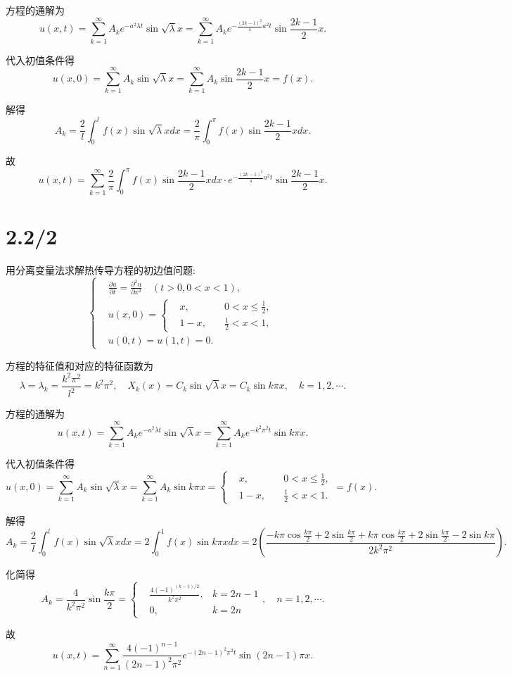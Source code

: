 \documentclass[11pt,a4paper]{article}
\begin{document}
方程的通解为
$$u(x,t)=\sum_{k=1}^\infty A_ke^{-a^2\lambda t}\sin\sqrt{\lambda}x=\sum_{k=1}^\infty A_k e^{-\frac{(2k-1)^2}{4}a^2 t}\sin\frac{2k-1}{2}x.$$

代入初值条件得
$$u(x,0)=\sum_{k=1}^\infty A_k\sin\sqrt{\lambda}x=\sum_{k=1}^\infty A_k\sin\frac{2k-1}{2}x=f(x).$$

解得
$$A_k=\frac{2}{l}\int_0^l f(x)\sin\sqrt{\lambda}xdx=\frac{2}{\pi}\int_0^\pi f(x)\sin\frac{2k-1}{2}xdx.$$

故
$$u(x,t)=\sum_{k=1}^\infty \frac{2}{\pi}\int_0^\pi f(x)\sin\frac{2k-1}{2}xdx \cdot e^{-\frac{(2k-1)^2}{4}a^2 t}\sin\frac{2k-1}{2}x.$$

\section{2.2/2}

\begin{problem}
用分离变量法求解热传导方程的初边值问题:
$$\left\{\begin{aligned}
     & \frac{\partial u}{\partial t}=\frac{\partial^2u}{\partial x^2}\quad (t>0,0<x<1), \\
     & u(x,0)=\left\{\begin{aligned}
       &x,\quad &0<x\leqslant\frac{1}{2},\\
       &1-x,\quad &\frac{1}{2}<x<1,
     \end{aligned}\right.                           \\
     & u(0,t) = u(1,t)=0.
  \end{aligned}\right.$$
\end{problem}

方程的特征值和对应的特征函数为
$$\lambda=\lambda_k=\frac{k^2\pi^2}{l^2}=k^2\pi^2,\quad X_k(x)=C_k\sin\sqrt{\lambda}x=C_k\sin k\pi x,\quad k=1,2,\cdots.$$

方程的通解为
$$u(x,t)=\sum_{k=1}^\infty A_ke^{-a^2\lambda t}\sin\sqrt{\lambda}x=\sum_{k=1}^\infty A_ke^{-k^2\pi^2 t}\sin k\pi x.$$

代入初值条件得
$$u(x,0)=\sum_{k=1}^\infty A_k\sin\sqrt{\lambda}x=\sum_{k=1}^\infty A_k\sin k\pi x=\left\{\begin{aligned}
  &x,\quad &0<x\leqslant\frac{1}{2},\\
  &1-x,\quad &\frac{1}{2}<x<1.
\end{aligned}\right.=f(x).$$

解得
$$A_k=\frac{2}{l}\int_0^l f(x)\sin\sqrt{\lambda}xdx=2\int_0^1 f(x)\sin k\pi xdx
=2\left(\frac{-k\pi\cos\frac{k\pi}{2}+2\sin\frac{k\pi}{2}+k\pi\cos\frac{k\pi}{2}+2\sin\frac{k\pi}{2}-2\sin k\pi}{2k^2\pi^2}\right).$$

化简得
$$A_k=\frac{4}{k^2\pi^2}\sin\frac{k\pi}{2}=\left\{\begin{aligned}&\frac{4(-1)^{(k-1)/2}}{k^2\pi^2}, & k = 2n-1 \\ &0, & k=2n \end{aligned}\right.,\quad n=1,2,\cdots.$$

故
$$u(x,t)=\sum_{n=1}^\infty \frac{4(-1)^{n-1}}{(2n-1)^2\pi^2} e^{-(2n-1)^2\pi^2 t}\sin (2n-1)\pi x.$$
\end{document}
